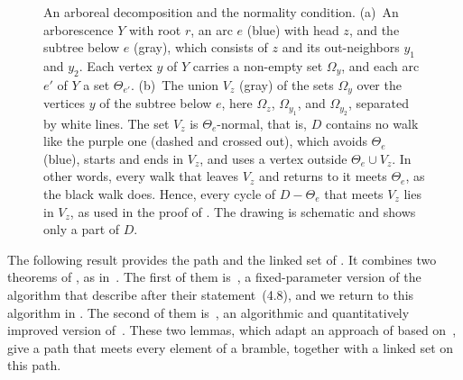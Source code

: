 \documentclass[fontsize=12pt,leading=14pt]{fullpaper}
\newcounter{step}
\begin{document}
\begin{figure}[ht]
  \caption{An arboreal decomposition and the normality condition.
    (a)~An arborescence $Y$ with root $r$, an arc $e$ (blue) with head $z$, and the subtree below $e$ (gray), which consists of $z$ and its out-neighbors $y_1$ and $y_2$.
    Each vertex $y$ of $Y$ carries a non-empty set $\Omega_y$, and each arc $e'$ of $Y$ a set $\Theta_{e'}$.
    (b)~The union $V_z$ (gray) of the sets $\Omega_y$ over the vertices $y$ of the subtree below $e$, here $\Omega_z$, $\Omega_{y_1}$, and $\Omega_{y_2}$, separated by white lines.
    The set $V_z$ is $\Theta_e$-normal, that is, $D$ contains no walk like the purple one (dashed and crossed out), which avoids $\Theta_e$ (blue), starts and ends in $V_z$, and uses a vertex outside $\Theta_e\cup V_z$.
    In other words, every walk that leaves $V_z$ and returns to it meets $\Theta_e$, as the black walk does.
    Hence, every cycle of $D-\Theta_e$ that meets $V_z$ lies in $V_z$, as used in the proof of .
  The drawing is schematic and shows only a part of $D$.}
  \label{fig:normal}
\end{figure}

The following result provides the path and the linked set of .
It combines two theorems of \textcite{CLMS22}, as in~\cite[Proposition~3.5]{CLNS26}.
The first of them is~\cite[Theorem~2.17]{CLMS22}, a fixed-parameter version of the algorithm that \textcite{Johnson2001} describe after their statement~(4.8), and we return to this algorithm in .
The second of them is~\cite[Theorem~2.23]{CLMS22}, an algorithmic and quantitatively improved version of~\cite[lemmas~4.3 and~4.4]{KawarabayashiK15}.
These two lemmas, which adapt an approach of \textcite{KK14} based on~\cite{RW12}, give a path that meets every element of a bramble, together with a linked set on this path.
\end{document}
